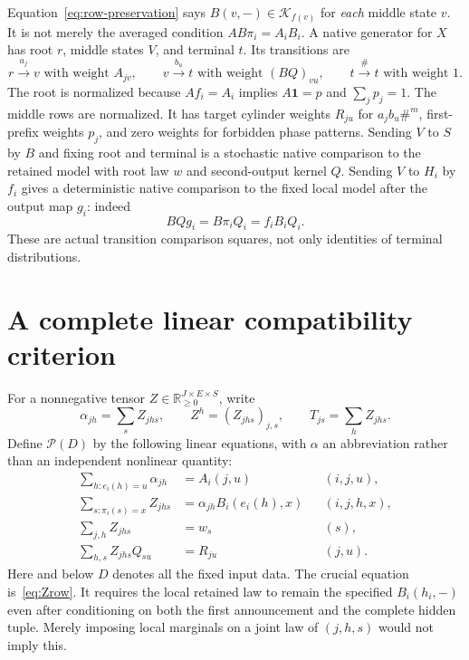 \documentclass[11pt]{article}
\newcommand{\R}{\mathbb R}
\newcommand{\one}{\mathbf 1}
\newcommand{\Pcal}{\mathcal P}
\newcommand{\Kcal}{\mathcal K}
\theoremstyle{remark}
\begin{document}
Equation~\eqref{eq:row-preservation} says $B(v,-)\in\Kcal_{f(v)}$ for \emph{each} middle state $v$. It is not merely the averaged condition $AB\pi_i=A_iB_i$. A native generator for $X$ has root $r$, middle states $V$, and terminal $t$. Its transitions are
\[
 r\xrightarrow{a_j}v\text{ with weight }A_{jv},\qquad
 v\xrightarrow{b_u}t\text{ with weight }(BQ)_{vu},\qquad
 t\xrightarrow{\#}t\text{ with weight }1.
\]
The root is normalized because $Af_i=A_i$ implies $A\one=p$ and $\sum_jp_j=1$. The middle rows are normalized. It has target cylinder weights $R_{ju}$ for $a_jb_u\#^m$, first-prefix weights $p_j$, and zero weights for forbidden phase patterns. Sending $V$ to $S$ by $B$ and fixing root and terminal is a stochastic native comparison to the retained model with root law $w$ and second-output kernel $Q$. Sending $V$ to $H_i$ by $f_i$ gives a deterministic native comparison to the fixed local model after the output map $g_i$: indeed
\[
 BQg_i=B\pi_iQ_i=f_iB_iQ_i.
\]
These are actual transition comparison squares, not only identities of terminal distributions.

\section{A complete linear compatibility criterion}\label{sec:criterion}

For a nonnegative tensor $Z\in\R_{\ge0}^{J\times E\times S}$, write
\[
 \alpha_{jh}=\sum_sZ_{jhs},\qquad
 Z^h=(Z_{jhs})_{j,s},\qquad T_{js}=\sum_hZ_{jhs}.
\]
Define $\Pcal(D)$ by the following linear equations, with $\alpha$ an abbreviation rather than an independent nonlinear quantity:
\begin{align}
 \sum_{h:e_i(h)=u}\alpha_{jh}&=A_i(j,u)
 &&(i,j,u),\label{eq:Zroot}\\
 \sum_{s:\pi_i(s)=x}Z_{jhs}&=\alpha_{jh}B_i(e_i(h),x)
 &&(i,j,h,x),\label{eq:Zrow}\\
 \sum_{j,h}Z_{jhs}&=w_s &&(s),\label{eq:Zw}\\
 \sum_{h,s}Z_{jhs}Q_{su}&=R_{ju} &&(j,u).\label{eq:ZR}
\end{align}
Here and below $D$ denotes all the fixed input data. The crucial equation is~\eqref{eq:Zrow}. It requires the local retained law to remain the specified $B_i(h_i,-)$ even after conditioning on both the first announcement and the complete hidden tuple. Merely imposing local marginals on a joint law of $(j,h,s)$ would not imply this.
\end{document}
